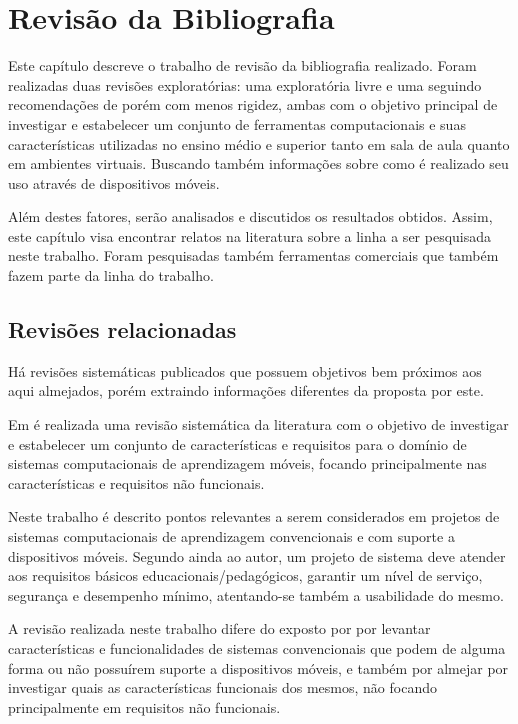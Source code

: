 \chapter{Revisão da Bibliografia}
\label{chap:revisao}

Este capítulo descreve o trabalho de revisão da bibliografia realizado. Foram realizadas duas revisões exploratórias: uma exploratória livre e uma seguindo recomendações de  porém com menos rigidez, ambas com o objetivo principal de investigar e estabelecer um conjunto de ferramentas computacionais e suas características utilizadas no ensino médio e superior tanto em sala de aula quanto em ambientes virtuais. Buscando também informações sobre como é realizado seu uso através de dispositivos móveis. 

Além destes fatores, serão analisados e discutidos os resultados obtidos. Assim, este capítulo visa encontrar relatos na literatura sobre a linha a ser pesquisada neste trabalho. Foram pesquisadas também ferramentas comerciais que também fazem parte da linha do trabalho. 
 
\section{Revisões relacionadas}
Há revisões sistemáticas publicados que possuem objetivos bem próximos aos aqui almejados, porém extraindo informações diferentes da proposta por este.

Em  é realizada uma revisão sistemática da literatura com o objetivo de investigar e estabelecer um conjunto de características e requisitos para o domínio de sistemas computacionais de aprendizagem móveis, focando principalmente nas características e requisitos não funcionais.

Neste trabalho é descrito pontos relevantes a serem considerados em projetos de sistemas computacionais de aprendizagem convencionais e com suporte a dispositivos móveis. Segundo ainda ao autor, um projeto de sistema deve atender aos requisitos básicos educacionais/pedagógicos, garantir um nível de serviço, segurança e desempenho mínimo, atentando-se também a usabilidade do mesmo.

A revisão realizada neste trabalho difere do exposto por  por levantar características e funcionalidades de sistemas convencionais que podem de alguma forma ou não possuírem suporte a dispositivos móveis, e também por almejar por investigar quais as características funcionais dos mesmos, não focando principalmente em requisitos não funcionais.


